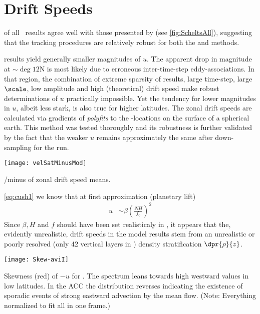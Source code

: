

\section{Drift Speeds}

 of all \AVI~results agree well with those presented by \citet{Chelton2011} (see \cref{fig:ScheltsAll}), suggesting that the tracking procedures are relatively robust for both the \MI and \MII methods.

 \popSevenII results yield generally smaller magnitudes of $u$.
The apparent drop in magnitude at $\sim\deg{12}$N is most likely due to erroneous inter-time-step eddy-associations. In that region, the combination of extreme sparsity of results, large time-step, large $\scale$, low amplitude and high (theoretical) drift speed make robust determinations of $u$ practically impossible.
Yet the tendency for lower magnitudes in $u$, albeit less stark, is also true for higher latitudes.
The zonal drift speeds are calculated via gradients of \textit{polyfits} to the \CoV-locations on the surface of a spherical earth. This method was tested thoroughly and its robustness is further validated by the fact that the weaker $u$ remains approximately the same after down-sampling for the \pToaII run.
\begin{marginfigure}
	\texttt{[image: velSatMinusMod]}
	\caption{\scriptsize{\aviI/\aviII minus \popSevenII of zonal drift speed means.}}
	\label{fig:velSatMinusMod}
\end{marginfigure}

 \eqref{eq:cush1} we know that at first approximation (planetary lift)
\begin{align}
u
&\sim
\beta \left( 	\frac{NH}{f_{0}}  \right)^{2}
\end{align}
Since $\beta, H$ and $f$ should have been set realisticaly in \POP, it appears that the, evidently unrealistic, drift speeds in the model results stem from an unrealistic or poorly resolved (only 42 vertical layers in \POP) density stratification $\dpr{\rho}{z}$.
\begin{marginfigure}
		\texttt{[image: Skew-aviI]}
		\caption{\scriptsize{Skewness (red) of $-u$ for \aviI. The spectrum leans towards high westward values in low latitudes. In the ACC the distribution reverses indicating the existence of sporadic events of strong eastward advection by the mean flow. (Note: Everything normalized to fit all in one frame.)}}
		\label{fig:SkewAviI}
\end{marginfigure}


\section{\popTwoII}
